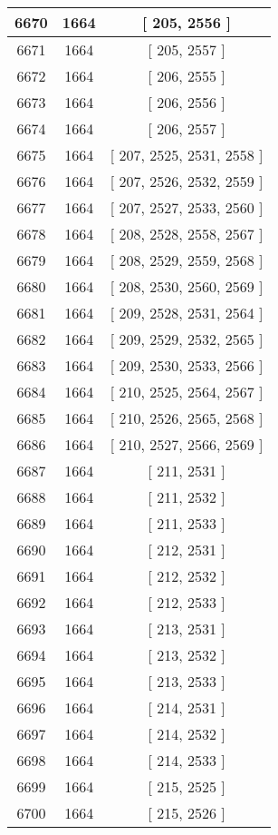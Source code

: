 \begin{center}
\begin{longtable}[H]{|| c c c ||}
\hline
6670 & 1664 & [ 205, 2556 ] \\ 
\hline
6671 & 1664 & [ 205, 2557 ] \\ 
\hline
6672 & 1664 & [ 206, 2555 ] \\ 
\hline
6673 & 1664 & [ 206, 2556 ] \\ 
\hline
6674 & 1664 & [ 206, 2557 ] \\ 
\hline
6675 & 1664 & [ 207, 2525, 2531, 2558 ] \\ 
\hline
6676 & 1664 & [ 207, 2526, 2532, 2559 ] \\ 
\hline
6677 & 1664 & [ 207, 2527, 2533, 2560 ] \\ 
\hline
6678 & 1664 & [ 208, 2528, 2558, 2567 ] \\ 
\hline
6679 & 1664 & [ 208, 2529, 2559, 2568 ] \\ 
\hline
6680 & 1664 & [ 208, 2530, 2560, 2569 ] \\ 
\hline
6681 & 1664 & [ 209, 2528, 2531, 2564 ] \\ 
\hline
6682 & 1664 & [ 209, 2529, 2532, 2565 ] \\ 
\hline
6683 & 1664 & [ 209, 2530, 2533, 2566 ] \\ 
\hline
6684 & 1664 & [ 210, 2525, 2564, 2567 ] \\ 
\hline
6685 & 1664 & [ 210, 2526, 2565, 2568 ] \\ 
\hline
6686 & 1664 & [ 210, 2527, 2566, 2569 ] \\ 
\hline
6687 & 1664 & [ 211, 2531 ] \\ 
\hline
6688 & 1664 & [ 211, 2532 ] \\ 
\hline
6689 & 1664 & [ 211, 2533 ] \\ 
\hline
6690 & 1664 & [ 212, 2531 ] \\ 
\hline
6691 & 1664 & [ 212, 2532 ] \\ 
\hline
6692 & 1664 & [ 212, 2533 ] \\ 
\hline
6693 & 1664 & [ 213, 2531 ] \\ 
\hline
6694 & 1664 & [ 213, 2532 ] \\ 
\hline
6695 & 1664 & [ 213, 2533 ] \\ 
\hline
6696 & 1664 & [ 214, 2531 ] \\ 
\hline
6697 & 1664 & [ 214, 2532 ] \\ 
\hline
6698 & 1664 & [ 214, 2533 ] \\ 
\hline
6699 & 1664 & [ 215, 2525 ] \\ 
\hline
6700 & 1664 & [ 215, 2526 ] \\ 
\hline

\end{longtable}
\end{center}
